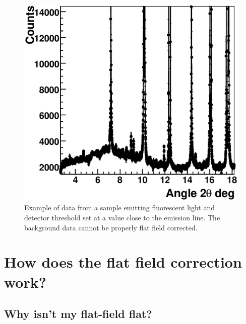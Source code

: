 \begin{figure}
\begin{center}
\includegraphics[width=\textwidth]{images/sample_with_fluorescence}
\end{center}
\caption{Example of data from a sample emitting fluorescent light and detector threshold set at a value close to the emission line. The background data cannot be properly flat field corrected.}\label{fig:samplefluo}
\end{figure}

\section{How does the flat field correction work?}

\subsection{Why isn't my flat-field flat?}

